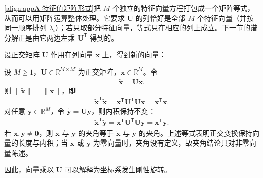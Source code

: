 \documentclass[../main.tex]{subfiles}
\begin{document}
\begin{remark}
\eqref{align:appA-特征值矩阵形式}把 $M$ 个独立的特征向量方程打包成一个矩阵等式，从而可以用矩阵运算整体处理。它要求 $\bm{U}$ 的列恰好是全部 $M$ 个特征向量（并按同一顺序排列 $\lambda_i$）；若只取部分特征向量，等式只在相应的列上成立。下一节的谱分解正是由它两边左乘 $\bm{U}^{\mathsf{T}}$ 得到的。
\end{remark}

设正交矩阵 $\bm{U}$ 作用在列向量 $\bm{x}$ 上，得到新的向量：
\begin{proposition}[正交变换保持长度与夹角]\label{proposition:appA-正交变换保内积}
设 $M\geqslant1$，$\bm{U}\in\mathbb{R}^{M\times M}$ 为正交矩阵，$\bm{x}\in\mathbb{R}^{M}$。令
\begin{align}
  \tilde{\bm{x}}=\bm{U}\bm{x}.
  \label{align:appA-正交变换}
\end{align}
则 $\|\tilde{\bm{x}}\|=\|\bm{x}\|$，即
\begin{align}
  \tilde{\bm{x}}^{\mathsf{T}}\tilde{\bm{x}}=\bm{x}^{\mathsf{T}}\bm{U}^{\mathsf{T}}\bm{U}\bm{x}=\bm{x}^{\mathsf{T}}\bm{x}.
  \label{align:appA-长度保持}
\end{align}
对任意 $\bm{y}\in\mathbb{R}^{M}$，令 $\tilde{\bm{y}}=\bm{U}\bm{y}$，则内积保持不变：
\begin{align}
  \tilde{\bm{x}}^{\mathsf{T}}\tilde{\bm{y}}=\bm{x}^{\mathsf{T}}\bm{U}^{\mathsf{T}}\bm{U}\bm{y}=\bm{x}^{\mathsf{T}}\bm{y}.
  \label{align:appA-夹角保持}
\end{align}
若 $\bm{x},\bm{y}\neq\bm{0}$，则 $\bm{x}$ 与 $\bm{y}$ 的夹角等于 $\tilde{\bm{x}}$ 与 $\tilde{\bm{y}}$ 的夹角。上述等式表明正交变换保持向量的长度与内积；当 $\bm{x}$ 或 $\bm{y}$ 为零向量时，夹角没有定义，故夹角结论只对非零向量陈述。
\end{proposition}

因此，向量乘以 $\bm{U}$ 可以解释为坐标系发生刚性旋转。
\end{document}
